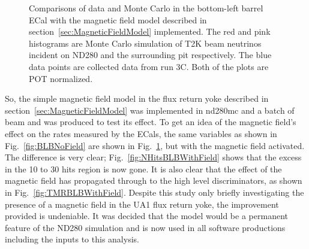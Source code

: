 \begin{figure}[bottom]%
  \centering
  \caption{Comparisons of data and Monte Carlo in the bottom-left barrel ECal with the magnetic field model described in section~\ref{sec:MagneticFieldModel} implemented.  The red and pink histograms are Monte Carlo simulation of T2K beam neutrinos incident on ND280 and the surrounding pit respectively.  The blue data points are collected data from run 3C.  Both of the plots are POT normalized.}
  \label{fig:BLBWithField}
\end{figure}
So, the simple magnetic field model in the flux return yoke described in section~\ref{sec:MagneticFieldModel} was implemented in nd280mc and a batch of beam and  was produced to test its effect.  To get an idea of the magnetic field's effect on the rates measured by the ECals, the same variables as shown in Fig.~\ref{fig:BLBNoField} are shown in Fig.~\ref{fig:BLBWithField}, but with the magnetic field activated.  The difference is very clear; Fig.~\ref{fig:NHitsBLBWithField} shows that the excess in the 10 to 30 hits region is now gone.  It is also clear that the effect of the magnetic field has propagated through to the high level discriminators, as shown in Fig.~\ref{fig:TMRBLBWithField}.
\newline
\newline
Despite this study only briefly investigating the presence of a magnetic field in the UA1 flux return yoke, the improvement provided is undeniable.  It was decided that the model would be a permanent feature of the ND280 simulation and is now used in all software productions including the inputs to this analysis.

